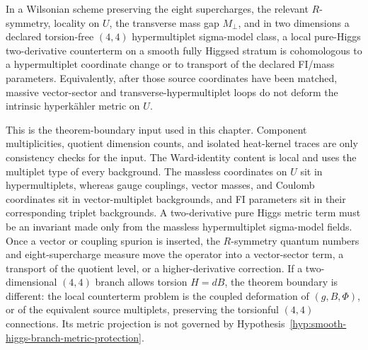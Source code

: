 \begin{hypothesis}
\label{hyp:smooth-higgs-branch-metric-protection}
In a Wilsonian scheme preserving the eight supercharges, the relevant
\(R\)-symmetry, locality on \(U\), the transverse mass gap \(M_\perp\), and in
two dimensions a declared torsion-free \((4,4)\) hypermultiplet sigma-model
class, a local pure-Higgs two-derivative counterterm on a smooth fully Higgsed
stratum is cohomologous to a hypermultiplet coordinate change or to transport of
the declared FI/mass parameters.  Equivalently, after those source coordinates
have been matched, massive vector-sector and transverse-hypermultiplet loops do
not deform the intrinsic hyperk\"ahler metric on \(U\).
\end{hypothesis}

This is the theorem-boundary input used in this chapter.  Component
multiplicities, quotient dimension counts, and isolated heat-kernel traces are
only consistency checks for the input.  The Ward-identity content is local and
uses the multiplet type of every background.  The massless coordinates on \(U\)
sit in hypermultiplets, whereas gauge couplings, vector masses, and Coulomb
coordinates sit in vector-multiplet backgrounds, and FI parameters sit in their
corresponding triplet backgrounds.  A two-derivative pure Higgs metric term
must be an invariant made only from the massless hypermultiplet sigma-model
fields.  Once a vector or coupling spurion is inserted, the \(R\)-symmetry
quantum numbers and eight-supercharge measure move the operator into a
vector-sector term, a transport of the quotient level, or a higher-derivative
correction.
If a two-dimensional \((4,4)\) branch allows torsion \(H=dB\), the theorem
boundary is different: the local counterterm problem is the coupled deformation
of \((g,B,\Phi)\), or of the equivalent source multiplets, preserving the
torsionful \((4,4)\) connections.  Its metric projection is not governed by
Hypothesis~\ref{hyp:smooth-higgs-branch-metric-protection}.


